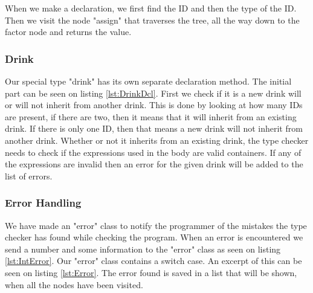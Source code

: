 When we make a declaration, we first find the ID and then the type of the ID. Then we visit the node "assign" that traverses the tree, all the way down to the factor node and returns the value.

\subsubsection{Drink}
Our special type "drink" has its own separate declaration method. The initial part can be seen on listing \ref{lst:DrinkDcl}. First we check if it is a new drink will or will not inherit from another drink. This is done by looking at how many IDs are present, if there are two, then it means that it will inherit from an existing drink. If there is only one ID, then that means a new drink will not inherit from another drink.
Whether or not it inherits from an existing drink, the type checker needs to check if the expressions used in the body are valid containers. If any of the expressions are invalid then an error for the given drink will be added to the list of errors.

\subsubsection{Error Handling}
We have made an "error" class to notify the programmer of the mistakes the type checker has found while checking the program. When an error is encountered we send a number and some information to the "error" class as seen on listing \ref{lst:IntError}.
Our "error" class contains a switch case. An excerpt of this can be seen on listing \ref{lst:Error}. The error found is saved in a list that will be shown, when all the nodes have been visited.
